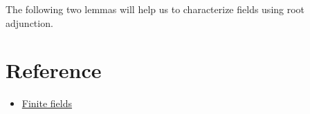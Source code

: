 The following two lemmas will help us to characterize fields using root adjunction.


\section{Reference}

\begin{itemize}
    \item \href{https://www.math.rwth-aachen.de/~Max.Neunhoeffer/Teaching/ff/ffchap3.pdf}{Finite fields}
\end{itemize}
